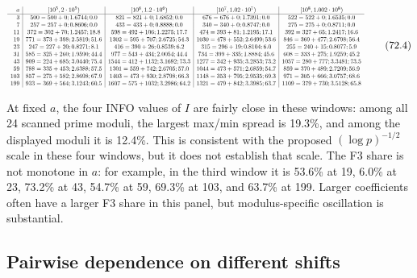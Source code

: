 \documentclass[10pt,reqno]{amsart}
\theoremstyle{definition}
\newcommand{\1}{\mathbf 1}
\begin{document}
\begin{equation}
\resizebox{\textwidth}{!}{$
\begin{array}{r|c|c|c|c}
a&[10^5,2\cdot10^5)&[10^6,1.2\cdot10^6)&[10^7,1.02\cdot10^7)&[10^8,1.002\cdot10^8)\\ \hline
3&500=500+0;1.6744;0.0&821=821+0;1.6852;0.0&676=676+0;1.7391;0.0&522=522+0;1.6535;0.0\\
7&257=257+0;0.8606;0.0&433=433+0;0.8888;0.0&340=340+0;0.8747;0.0&275=275+0;0.8711;0.0\\
11&372=302+70;1.2457;18.8&598=492+106;1.2275;17.7&474=393+81;1.2195;17.1&392=327+65;1.2417;16.6\\
19&771=373+398;2.5819;51.6&1302=595+707;2.6725;54.3&1030=478+552;2.6499;53.6&846=369+477;2.6798;56.4\\
23&247=227+20;0.8271;8.1&416=390+26;0.8539;6.2&315=296+19;0.8104;6.0&255=240+15;0.8077;5.9\\
31&585=325+260;1.9590;44.4&977=543+434;2.0054;44.4&734=399+335;1.8884;45.6&608=333+275;1.9259;45.2\\
43&909=224+685;3.0440;75.4&1544=412+1132;3.1692;73.3&1277=342+935;3.2853;73.2&1057=280+777;3.3481;73.5\\
59&788=335+453;2.6388;57.5&1301=559+742;2.6705;57.0&1044=473+571;2.6859;54.7&859=370+489;2.7209;56.9\\
103&857=275+582;2.8698;67.9&1403=473+930;2.8798;66.3&1148=353+795;2.9535;69.3&971=305+666;3.0757;68.6\\
199&933=369+564;3.1243;60.5&1607=575+1032;3.2986;64.2&1321=479+842;3.3985;63.7&1109=379+730;3.5128;65.8
\end{array}
$}                                                          \tag{72.4}
\end{equation}

At fixed $a$, the four INFO values of $I$ are fairly close in these
windows: among all 24 scanned prime moduli, the largest max/min spread is
19.3\%, and among the displayed moduli it is 12.4\%.  This is consistent with
the proposed $(\log p)^{-1/2}$ scale in these four windows, but it does not
establish that scale.  The F3 share is not monotone in $a$: for example, in
the third window it is 53.6\% at 19, 6.0\% at 23, 73.2\% at 43, 54.7\% at 59,
69.3\% at 103, and 63.7\% at 199.  Larger coefficients often have a larger F3
share in this panel, but modulus-specific oscillation is substantial.

\subsection{Pairwise dependence on different shifts}
\end{document}
